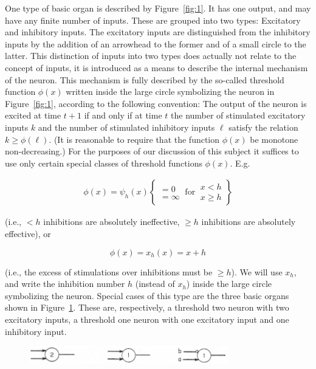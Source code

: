 \documentclass[twocolumn,preprintnumbers,amsmath,amssymb,floatfix]{revtex4}
\begin{document}
One type of basic organ is described by Figure~\ref{fig:1}. It has
one output, and may have any finite number of inputs. These are
grouped into two types: Excitatory and inhibitory inputs. The
excitatory inputs are distinguished from the inhibitory inputs by
the addition of an arrowhead to the former and of a small circle
to the latter. This distinction of inputs into two types does
actually not relate to the concept of inputs, it is introduced as
a means to describe the internal mechanism of the neuron. This
mechanism is fully described by the so-called threshold function
$\phi(x)$ written inside the large circle symbolizing the neuron
in Figure~\ref{fig:1}, according to the following convention: The
output of the neuron is excited at time $t+1$ if and only if at
time $t$ the number of stimulated excitatory inputs $k$ and the
number of stimulated inhibitory inputs $\ell$ satisfy the relation
$k\geq \phi(\ell)$. (It is reasonable to require that the function
$\phi(x)$ be monotone non-decreasing.) For the purposes of our
discussion of this subject it suffices to use only certain special
classes of threshold functions $\phi(x)$. E.g.

\begin{eqnarray}
\phi(x) = \psi_{h}(x) \left\{
\begin{array}{l}
=0\\
=\infty
\end{array}
\mathrm{~for~}
\begin{array}{r}
x < h\\
x \geq h
\end{array}\right\}
\label{eq:1}
\end{eqnarray}

\noindent (i.e., $<h$ inhibitions are absolutely ineffective,
$\geq h$ inhibitions are absolutely effective), or

\begin{equation}
\phi(x)=x_{h}(x)=x+h \label{eq:2}
\end{equation}

\noindent (i.e., the excess of stimulations over inhibitions must
be $\geq h$). We will use $x_{h}$, and write the inhibition number
$h$ (instead of $x_h$) inside the large circle symbolizing the
neuron. Special cases of this type are the three basic organs
shown in Figure~\ref{fig:2}. These are, respectively, a threshold
two neuron with two excitatory inputs, a threshold one neuron with
one excitatory input and one inhibitory input.

\begin{figure}
\includegraphics[width=3.4in]{fig_2}
\caption{\label{fig:2}}
\end{figure}
\end{document}
